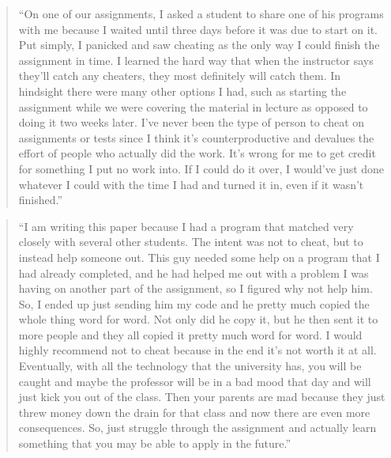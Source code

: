 \documentclass[12pt]{scrartcl}
\begin{document}
\begin{quote}
``On one of our assignments, I asked a student to share one of his programs with me
because I waited until three days before it was due to start on it. Put simply, I panicked and saw cheating as the only way I could finish the assignment in time. I learned the hard way that when the instructor says they'll catch any cheaters, they most definitely will catch them. In hindsight there were many other options I had, such as starting the assignment while we were covering the material in lecture as opposed to doing it two weeks later. I've never been the type of person to cheat on assignments or tests since I think it's counterproductive and devalues the effort of people who actually did the work. It's wrong for me to get credit for something I put no work into. If I could do it over, I would've just done whatever I could with the time I had and turned it in, even if it wasn't finished.''
\end{quote}

\begin{quote}
``I am writing this paper because I had a program that matched very closely with several other students. The intent was not to cheat, but to instead help someone out. This guy needed some help on a program that I had already completed, and he had helped me out with a problem I was having on another part of the assignment, so I figured why not help him. So, I ended up just sending him my code and he pretty much copied the whole thing word for word.  Not only did he copy it, but he then sent it to more people and they all copied it pretty much word for word.
	I would highly recommend not to cheat because in the end it's not worth it at all. Eventually, with all the technology that the university has, you will be caught and maybe the professor will be in a bad mood that day and will just kick you out of the class. Then your parents are mad because they just threw money down the drain for that class and now there are even more consequences. So, just struggle through the assignment and actually learn something that you may be able to apply in the future.''
\end{quote}
\end{document}
